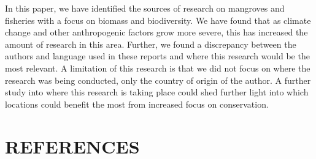 \documentclass[
  12pt,
]{article}
\begin{document}
In this paper, we have identified the sources of research on mangroves and fisheries with a focus on biomass and biodiversity. We have found that as climate change and other anthropogenic factors grow more severe, this has increased the amount of research in this area. Further, we found a discrepancy between the authors and language used in these reports and where this research would be the most relevant. A limitation of this research is that we did not focus on where the research was being conducted, only the country of origin of the author. A further study into where this research is taking place could shed further light into which locations could benefit the most from increased focus on conservation.

\newpage

\hypertarget{references}{%
\section*{REFERENCES}\label{references}}
\end{document}
